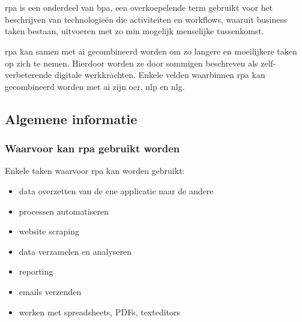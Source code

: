 \chapter{}
\label{ch:stand-van-zaken}

\acrshort{rpa} is een onderdeel van \acrfull{bpa}, een overkoepelende term gebruikt voor het beschrijven van technologieën die \gls{activiteit}en en \gls{workflow}s, waaruit business taken bestaan, uitvoeren met zo min mogelijk menselijke tussenkomst. \autocite{everythingRPA}

\acrshort{rpa} kan samen met \acrfull{ai} gecombineerd worden om zo langere en moeilijkere taken op zich te nemen. Hierdoor worden ze door sommigen beschreven als zelf-verbeterende digitale werkkrachten. Enkele velden waarbinnen \acrshort{rpa} kan gecombineerd worden met \acrshort{ai} zijn \acrfull{ocr}, \acrfull{nlp} en \acrfull{nlg}. \autocite{everythingRPA}

\section{Algemene informatie}

\subsection{Waarvoor kan \acrshort{rpa} gebruikt worden}
Enkele taken waarvoor \acrshort{rpa} kan worden gebruikt:
\begin{itemize}
	\item data overzetten van de ene applicatie naar de andere
	\item processen automatiseren
	\item website scraping
	\item data verzamelen en analyseren
	\item reporting
	\item emails verzenden
	\item werken met spreadsheets, PDFs, texteditors
\end{itemize}
\autocite{everythingRPA} \autocite{idrRPA}

